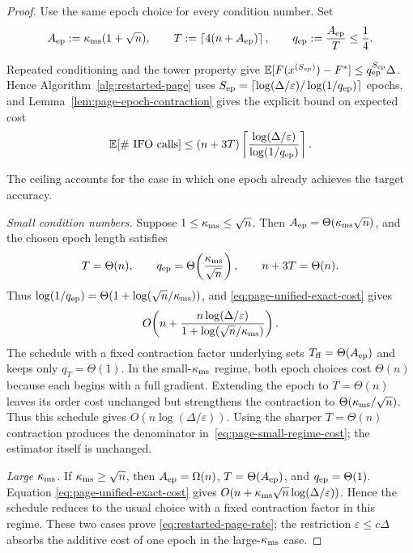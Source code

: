 \documentclass{article}
\newcommand{\E}{\mathbb{E}}
\theoremstyle{definition}
\begin{document}
\begin{proof}
Use the same epoch choice for every condition number.  Set
\begin{equation}
 A_{\rm ep}:=\kappa_{\rm ms}(1+\sqrt n),
 \qquad
 T:=\left\lceil4(n+A_{\rm ep})\right\rceil,
 \qquad
 q_{\rm ep}:=\frac{A_{\rm ep}}{T}\le\frac14.
 \label{eq:page-unified-epoch}
\end{equation}

Repeated conditioning and the tower property give
$\E[F(x^{(S_{\rm ep})})-F^*]\le
q_{\rm ep}^{S_{\rm ep}}\Delta$.  Hence Algorithm~\ref{alg:restarted-page}
uses
$S_{\rm ep}=\lceil\log(\Delta/\varepsilon)/\log(1/q_{\rm ep})\rceil$
epochs, and
Lemma~\ref{lem:page-epoch-contraction} gives the explicit bound on expected cost
\begin{equation}
 \E[\#\text{ IFO calls}]
 \le(n+3T)
 \left\lceil
 \frac{\log(\Delta/\varepsilon)}{\log(1/q_{\rm ep})}
 \right\rceil.
 \label{eq:page-unified-exact-cost}
\end{equation}

The ceiling accounts for the case in which one epoch already achieves the
target accuracy.

\emph{Small condition numbers.}
Suppose $1\le\kappa_{\rm ms}\le\sqrt n$.  Then
$A_{\rm ep}=\Theta(\kappa_{\rm ms}\sqrt n)$, and the chosen epoch length satisfies
\begin{equation*}
 T=\Theta(n),\qquad
 q_{\rm ep}=\Theta\!\left(\frac{\kappa_{\rm ms}}{\sqrt n}\right),
 \qquad n+3T=\Theta(n).
\end{equation*}
Thus
$\log(1/q_{\rm ep})=
\Theta(1+\log(\sqrt n/\kappa_{\rm ms}))$, and
\eqref{eq:page-unified-exact-cost} gives
\begin{equation}
 O\!\left(
 n+\frac{n\log(\Delta/\varepsilon)}
 {1+\log(\sqrt n/\kappa_{\rm ms})}
 \right).
 \label{eq:page-small-regime-cost}
\end{equation}
The schedule with a fixed contraction factor underlying
\citet[Corollary~6]{li2021page} sets
$T_{\rm ff}=\Theta(A_{\rm ep})$ and keeps only $q_T=\Theta(1)$.  In the
small-$\kappa_{\rm ms}$ regime, both epoch choices cost $\Theta(n)$ because
each begins with a full gradient.  Extending the epoch to $T=\Theta(n)$ leaves
its order cost unchanged but strengthens the contraction to
$\Theta(\kappa_{\rm ms}/\sqrt n)$.  Thus this schedule gives
$O(n\log(\Delta/\varepsilon))$.  Using the sharper $T=\Theta(n)$ contraction produces the
denominator in~\eqref{eq:page-small-regime-cost}; the estimator itself is
unchanged.

\emph{Large $\kappa_{\rm ms}$.}
If $\kappa_{\rm ms}\ge\sqrt n$, then $A_{\rm ep}=\Omega(n)$,
$T=\Theta(A_{\rm ep})$, and $q_{\rm ep}=\Theta(1)$.  Equation
\eqref{eq:page-unified-exact-cost} gives
$O(n+\kappa_{\rm ms}\sqrt n\log(\Delta/\varepsilon))$.  Hence the schedule
reduces to the usual choice with a fixed contraction factor in this regime.  These two cases prove
\eqref{eq:restarted-page-rate}; the restriction $\varepsilon\le c\Delta$
absorbs the additive cost of one epoch in the large-$\kappa_{\rm ms}$ case.
\end{proof}
\end{document}

